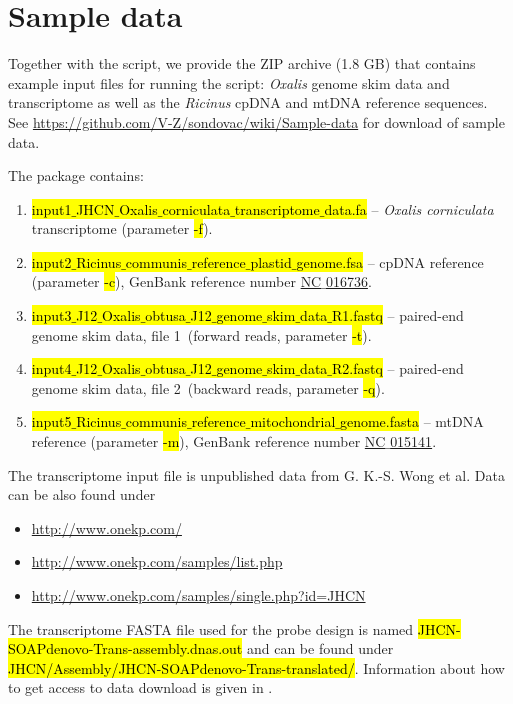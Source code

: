 \documentclass[a4paper, 11pt, twoside]{article}
\renewcommand{\texttt}[1]{\hl{\ttfamily #1}}
\begin{document}
\section{Sample data}

Together with the script, we provide the ZIP archive (1.8 GB) that contains example input files for running the script: \textit{Oxalis} genome skim data and transcriptome as well as the \textit{Ricinus} cpDNA and mtDNA reference sequences. See \url{https://github.com/V-Z/sondovac/wiki/Sample-data} for download of sample data.

The package contains:

\begin{enumerate}
  \item \texttt{input1$\_$JHCN$\_$Oxalis$\_$corniculata$\_$transcriptome$\_$data.fa} -- \textit{Oxalis corniculata} transcriptome (parameter \texttt{-f}).
  \item \texttt{input2$\_$Ricinus$\_$communis$\_$reference$\_$plastid$\_$genome.fsa} -- cpDNA reference (para\-meter \texttt{-c}), GenBank reference number \href{https://www.ncbi.nlm.nih.gov/nuccore/372450118/}{NC$\_$016736}.
  \item \texttt{input3$\_$J12$\_$Oxalis$\_$obtusa$\_$J12$\_$genome$\_$skim$\_$data$\_$R1.fastq} -- paired-end genome sk\-im data, file 1~(forward reads, parameter \texttt{-t}).
  \item \texttt{input4$\_$J12$\_$Oxalis$\_$obtusa$\_$J12$\_$genome$\_$skim$\_$data$\_$R2.fastq} -- paired-end genome sk\-im data, file 2~(backward reads, parameter \texttt{-q}).
  \item \texttt{input5$\_$Ricinus$\_$communis$\_$reference$\_$mitochondrial$\_$genome.fasta} -- mtDNA reference (parameter \texttt{-m}), GenBank reference number \href{https://www.ncbi.nlm.nih.gov/nuccore/323649872/}{NC$\_$015141}.
\end{enumerate}

The transcriptome input file is unpublished data from G. K.-S. Wong et al. Data can be also found under

\begin{itemize}
  \item \url{http://www.onekp.com/}
  \item \url{http://www.onekp.com/samples/list.php}
  \item \url{http://www.onekp.com/samples/single.php?id=JHCN}
\end{itemize}

The transcriptome FASTA file used for the probe design is named \texttt{JHCN-SOAPdenovo-Trans-assembly.dnas.out} and can be found under \texttt{JHCN/Assembly/JHCN-SOAPdenovo-Trans-translated/}. Information about how to get access to data download is given in \citet{Matasci2014}.
\end{document}
